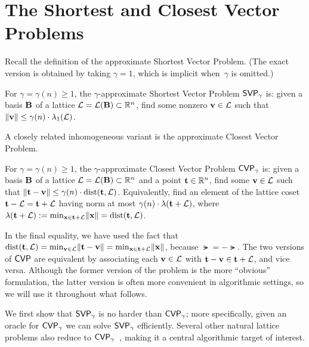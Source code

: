 \documentclass[11pt]{article}
\begin{document}
\thispagestyle{fancy} %


\section{The Shortest and Closest Vector Problems}%
\label{sec:svp-cvp}

Recall the definition of the approximate Shortest Vector Problem.
(The exact version is obtained by taking $\gamma=1$, which is implicit when~$\gamma$ is omitted.)

\begin{definition}%
  \label{def:svp}
  For $\gamma = \gamma(n) \geq 1$, the $\gamma$-approximate Shortest Vector Problem $\mathsf{SVP}_{\gamma}$ is: given a basis $\mathbf{B}$ of a lattice $\mathcal{L} = \mathcal{L}(\mathbf{B}) \subset \mathbb{R}^{n}$, find some nonzero $\mathbf{v} \in \mathcal{L}$ such that $\lVert\mathbf{v}\rVert \leq \gamma(n) \cdot \lambda_{1}(\mathcal{L})$.
\end{definition}

\noindent A closely related inhomogeneous variant is the approximate Closest Vector Problem.

\begin{definition}%
  \label{def:cvp}
  For $\gamma = \gamma(n) \geq 1$, the $\gamma$-approximate Closest Vector Problem $\mathsf{CVP}_{\gamma}$ is: given a basis $\mathbf{B}$ of a lattice $\mathcal{L} = \mathcal{L}(\mathbf{B}) \subset \mathbb{R}^{n}$ and a point $\mathbf{t} \in \mathbb{R}^{n}$, find some $\mathbf{v} \in \mathcal{L}$ such that $\lVert\mathbf{t} - \mathbf{v}\rVert \leq \gamma(n) \cdot \operatorname{dist}(\mathbf{t},\mathcal{L})$.
  Equivalently, find an element of the lattice coset $\mathbf{t} - \mathcal{L} = \mathbf{t} + \mathcal{L}$ having norm at most $\gamma(n) \cdot \lambda(\mathbf{t}+\mathcal{L})$, where $\lambda(\mathbf{t}+\mathcal{L}) := \min_{\mathbf{x} \in \mathbf{t}+\mathcal{L}} \lVert\mathbf{x}\rVert = \operatorname{dist}(\mathbf{t},\mathcal{L})$.
\end{definition}

In the final equality, we have used the fact that $\operatorname{dist}(\mathbf{t}, \mathcal{L}) = \min_{\mathbf{v} \in \mathcal{L}} \lVert\mathbf{t} - \mathbf{v}\rVert = \min_{\mathbf{x} \in \mathbf{t}+\mathcal{L}} \lVert\mathbf{x}\rVert$, because $\lat = -\lat$.
The two versions of $\mathsf{CVP}$ are equivalent by associating each $\mathbf{v} \in \mathcal{L}$ with $\mathbf{t} - \mathbf{v} \in \mathbf{t} + \mathcal{L}$, and vice versa.
Although the former version of the problem is the more ``obvious'' formulation, the latter version is often more convenient in algorithmic settings, so we will use it throughout what follows.

We first show that $\mathsf{SVP}_{\gamma}$ is no harder than $\mathsf{CVP}_{\gamma}$; more specifically, given an oracle for $\mathsf{CVP}_{\gamma}$ we can solve $\mathsf{SVP}_{\gamma}$ efficiently.
Several other natural lattice problems also reduce to $\mathsf{CVP}_{\gamma}$~\cite{DBLP:conf/soda/Micciancio08}, making it a central algorithmic target of interest.
\end{document}
